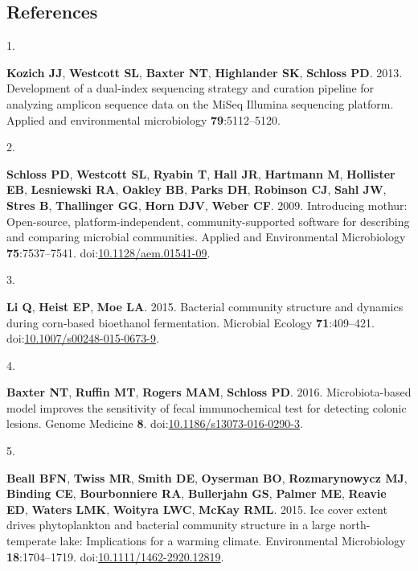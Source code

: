 \documentclass[
]{article}
\newlength{\cslhangindent}
\newlength{\csllabelwidth}
\newlength{\cslentryspacingunit} %
\newenvironment{CSLReferences}[2] %
 {%
  \setlength{\parindent}{0pt}
  \ifodd #1
  \let\oldpar\par
  \def\par{\hangindent=\cslhangindent\oldpar}
  \fi
  \setlength{\parskip}{#2\cslentryspacingunit}
 }%
 {}
\newcommand{\CSLLeftMargin}[1]{\parbox[t]{\csllabelwidth}{#1}}
\newcommand{\CSLRightInline}[1]{\parbox[t]{\linewidth - \csllabelwidth}{#1}\break}
\begin{document}
\hypertarget{references}{%
\subsection{References}\label{references}}

\setlength{\parindent}{-0.25in}
\setlength{\leftskip}{0.25in}

\noindent

\hypertarget{refs}{}
\begin{CSLReferences}{0}{1}
\leavevmode{}%
\CSLLeftMargin{1. }%
\CSLRightInline{\textbf{Kozich JJ}, \textbf{Westcott SL}, \textbf{Baxter
NT}, \textbf{Highlander SK}, \textbf{Schloss PD}. 2013. {Development of
a dual-index sequencing strategy and curation pipeline for analyzing
amplicon sequence data on the MiSeq Illumina sequencing platform}.
Applied and environmental microbiology \textbf{79}:5112--5120.}

\leavevmode{}%
\CSLLeftMargin{2. }%
\CSLRightInline{\textbf{Schloss PD}, \textbf{Westcott SL},
\textbf{Ryabin T}, \textbf{Hall JR}, \textbf{Hartmann M},
\textbf{Hollister EB}, \textbf{Lesniewski RA}, \textbf{Oakley BB},
\textbf{Parks DH}, \textbf{Robinson CJ}, \textbf{Sahl JW}, \textbf{Stres
B}, \textbf{Thallinger GG}, \textbf{Horn DJV}, \textbf{Weber CF}. 2009.
Introducing mothur: Open-source, platform-independent,
community-supported software for describing and comparing microbial
communities. Applied and Environmental Microbiology
\textbf{75}:7537--7541.
doi:\href{https://doi.org/10.1128/aem.01541-09}{10.1128/aem.01541-09}.}

\leavevmode{}%
\CSLLeftMargin{3. }%
\CSLRightInline{\textbf{Li Q}, \textbf{Heist EP}, \textbf{Moe LA}. 2015.
Bacterial community structure and dynamics during corn-based bioethanol
fermentation. Microbial Ecology \textbf{71}:409--421.
doi:\href{https://doi.org/10.1007/s00248-015-0673-9}{10.1007/s00248-015-0673-9}.}

\leavevmode{}%
\CSLLeftMargin{4. }%
\CSLRightInline{\textbf{Baxter NT}, \textbf{Ruffin MT}, \textbf{Rogers
MAM}, \textbf{Schloss PD}. 2016. Microbiota-based model improves the
sensitivity of fecal immunochemical test for detecting colonic lesions.
Genome Medicine \textbf{8}.
doi:\href{https://doi.org/10.1186/s13073-016-0290-3}{10.1186/s13073-016-0290-3}.}

\leavevmode{}%
\CSLLeftMargin{5. }%
\CSLRightInline{\textbf{Beall BFN}, \textbf{Twiss MR}, \textbf{Smith
DE}, \textbf{Oyserman BO}, \textbf{Rozmarynowycz MJ}, \textbf{Binding
CE}, \textbf{Bourbonniere RA}, \textbf{Bullerjahn GS}, \textbf{Palmer
ME}, \textbf{Reavie ED}, \textbf{Waters LMK}, \textbf{Woityra LWC},
\textbf{McKay RML}. 2015. Ice cover extent drives phytoplankton and
bacterial community structure in a large north-temperate lake:
Implications for a warming climate. Environmental Microbiology
\textbf{18}:1704--1719.
doi:\href{https://doi.org/10.1111/1462-2920.12819}{10.1111/1462-2920.12819}.}


\end{CSLReferences}
\end{document}
